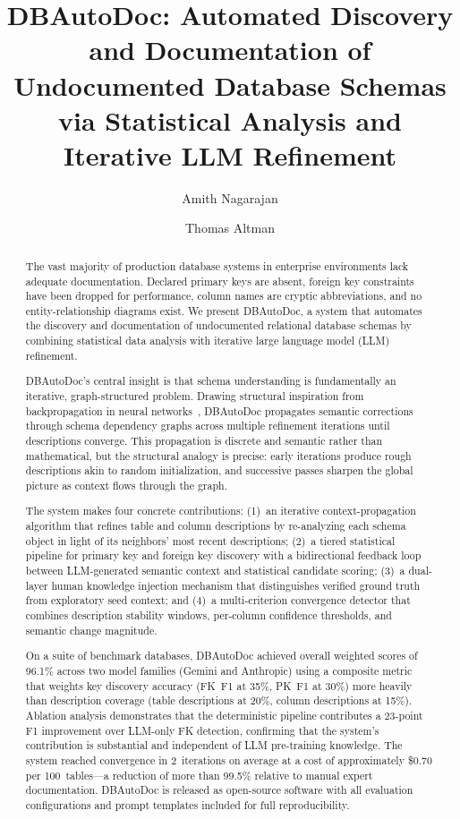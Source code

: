\documentclass[sigconf, nonacm]{acmart}
\title{DBAutoDoc: Automated Discovery and Documentation of Undocumented Database Schemas via Statistical Analysis and Iterative LLM Refinement}
\author{Amith Nagarajan}
\affiliation{%
  \institution{Blue Cypress}
}
\author{Thomas Altman}
\affiliation{%
  \institution{Tasio Labs (a Blue Cypress company)}
}
\begin{document}
\begin{abstract}
The vast majority of production database systems in enterprise environments lack adequate documentation. Declared primary keys are absent, foreign key constraints have been dropped for performance, column names are cryptic abbreviations, and no entity-relationship diagrams exist. We present DBAutoDoc, a system that automates the discovery and documentation of undocumented relational database schemas by combining statistical data analysis with iterative large language model (LLM) refinement.

DBAutoDoc's central insight is that schema understanding is fundamentally an iterative, graph-structured problem. Drawing structural inspiration from backpropagation in neural networks~\cite{rumelhart1986backprop}, DBAutoDoc propagates semantic corrections through schema dependency graphs across multiple refinement iterations until descriptions converge. This propagation is discrete and semantic rather than mathematical, but the structural analogy is precise: early iterations produce rough descriptions akin to random initialization, and successive passes sharpen the global picture as context flows through the graph.

The system makes four concrete contributions: (1)~an iterative context-propagation algorithm that refines table and column descriptions by re-analyzing each schema object in light of its neighbors' most recent descriptions; (2)~a tiered statistical pipeline for primary key and foreign key discovery with a bidirectional feedback loop between LLM-generated semantic context and statistical candidate scoring; (3)~a dual-layer human knowledge injection mechanism that distinguishes verified ground truth from exploratory seed context; and (4)~a multi-criterion convergence detector that combines description stability windows, per-column confidence thresholds, and semantic change magnitude.

On a suite of benchmark databases, DBAutoDoc achieved overall weighted scores of 96.1\% across two model families (Gemini and Anthropic) using a composite metric that weights key discovery accuracy (FK~F1 at 35\%, PK~F1 at 30\%) more heavily than description coverage (table descriptions at 20\%, column descriptions at 15\%). Ablation analysis demonstrates that the deterministic pipeline contributes a 23-point F1 improvement over LLM-only FK detection, confirming that the system's contribution is substantial and independent of LLM pre-training knowledge. The system reached convergence in 2~iterations on average at a cost of approximately \$0.70 per 100~tables---a reduction of more than 99.5\% relative to manual expert documentation. DBAutoDoc is released as open-source software with all evaluation configurations and prompt templates included for full reproducibility.
\end{abstract}
\end{document}
